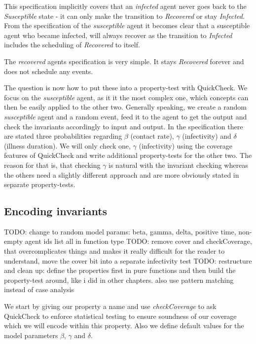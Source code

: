 This specification implicitly covers that an \textit{infected} agent never goes back to the \textit{Susceptible} state - it can only make the transition to \textit{Recovered} or stay \textit{Infected}. From the specification of the \textit{susceptible} agent it becomes clear that a susceptible agent who became infected, will always recover as the transition to \textit{Infected} includes the scheduling of \textit{Recovered} to itself. 

The \textit{recovered} agents specification is very simple. It stays \textit{Recovered} forever and does not schedule any events.

The question is now how to put these into a property-test with QuickCheck. We focus on the \textit{susceptible} agent, as it it the most complex one, which concepts can then be easily applied to the other two. Generally speaking, we create a random \textit{susceptible} agent and a random event, feed it to the agent to get the output and check the invariants accordingly to input and output. In the specification there are stated three probabilities regarding $\beta$ (contact rate), $\gamma$ (infectivity) and $\delta$ (illness duration). We will only check one, $\gamma$ (infectivity) using the coverage features of QuickCheck and write additional property-tests for the other two. The reason for that is, that checking $\gamma$ is natural with the invariant checking whereas the others need a slightly different approach and are more obviously stated in separate property-tests.

\subsection{Encoding invariants}
TODO: change to random model params: beta, gamma, delta, positive time, non-empty agent ids list all in function type
TODO: remove cover and checkCoverage, that overcomplicates things and makes it really difficult for the reader to understand, move the cover bit into a separate infectivity test
TODO: restructure and clean up: define the properties first in pure functions and then build the property-test around, like i did in other chapters. also use pattern matching instead of case analysis

We start by giving our property a name and use \textit{checkCoverage} to ask QuickCheck to enforce statistical testing to ensure soundness of our coverage which we will encode within this property. Also we define default values for the model parameters $\beta$, $\gamma$ and $\delta$.

